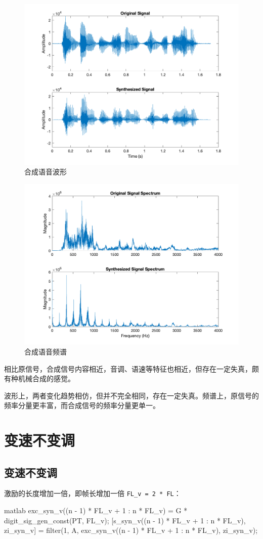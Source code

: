 \documentclass[a4paper]{article}  %
\begin{document}
\begin{figure}[ht]
    \centering
    \includegraphics[width=.6\textwidth]{asserts/1_10_synthesized_signal_t.png}
    \caption{
        合成语音波形
    }\label{fig:1_10_synthesized_signal_t}
\end{figure}

\begin{figure}[ht]
    \centering
    \includegraphics[width=.6\textwidth]{asserts/1_10_synthesized_signal_f.png}
    \caption{
        合成语音频谱
    }\label{fig:1_10_synthesized_signal_f}
\end{figure}

相比原信号，合成信号内容相近，音调、语速等特征也相近，但存在一定失真，颇有种机械合成的感觉。

波形上，两者变化趋势相仿，但并不完全相同，存在一定失真。频谱上，原信号的频率分量更丰富，而合成信号的频率分量更单一。

\section{变速不变调}

\subsection{变速不变调}

激励的长度增加一倍，即帧长增加一倍 \texttt{FL\_v = 2 * FL}：
\begin{codeblock}{matlab}
exc_syn_v((n - 1) * FL_v + 1 : n * FL_v) = G * digit_sig_gen_const(PT, FL_v);
[s_syn_v((n - 1) * FL_v + 1 : n * FL_v), zi_syn_v] = filter(1, A, exc_syn_v((n - 1) * FL_v + 1 : n * FL_v), zi_syn_v);
\end{codeblock}
\end{document}
